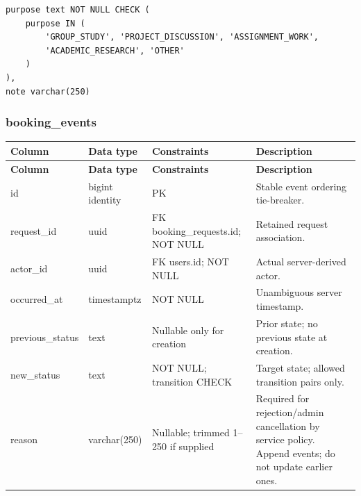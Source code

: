 \begingroup
\small
\begin{samepage}
\begin{verbatim}
purpose text NOT NULL CHECK (
    purpose IN (
        'GROUP_STUDY', 'PROJECT_DISCUSSION', 'ASSIGNMENT_WORK',
        'ACADEMIC_RESEARCH', 'OTHER'
    )
),
note varchar(250)
\end{verbatim}
\end{samepage}
\endgroup

\subsubsection{booking\allowbreak\_\allowbreak{}events}

\begin{longtable}{|p{}|p{}|p{}|p{}|}

\hline

\textbf{Column} & \textbf{Data type} & \textbf{Constraints} & \textbf{Description} \\ \hline

\endfirsthead

\hline

\textbf{Column} & \textbf{Data type} & \textbf{Constraints} & \textbf{Description} \\ \hline

\endhead

id & bigint identity & PK & Stable event ordering tie-breaker. \\ \hline

request\allowbreak\_\allowbreak{}id & uuid & FK booking\allowbreak\_\allowbreak{}requests.id; NOT NULL & Retained request association. \\ \hline

actor\allowbreak\_\allowbreak{}id & uuid & FK users.id; NOT NULL & Actual server-derived actor. \\ \hline

occurred\allowbreak\_\allowbreak{}at & timestamptz & NOT NULL & Unambiguous server timestamp. \\ \hline

previous\allowbreak\_\allowbreak{}status & text & Nullable only for creation & Prior state; no previous state at creation. \\ \hline

new\allowbreak\_\allowbreak{}status & text & NOT NULL; transition CHECK & Target state; allowed transition pairs only. \\ \hline

reason & varchar(250) & Nullable; trimmed 1–250 if supplied & Required for rejection/\allowbreak{}admin cancellation by service policy. Append events; do not update earlier ones. \\ \hline

\end{longtable}


